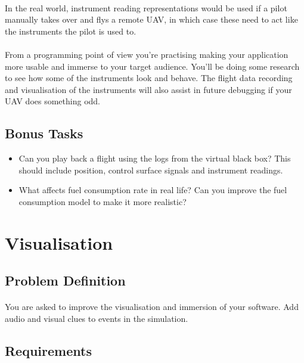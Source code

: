 \documentclass[11pt]{book}
\begin{document}
\paragraph{} In the real world, instrument reading representations would be used if a pilot manually takes over and flys a remote UAV, in which case these need to act like the instruments the pilot is used to. 

\paragraph{} From a programming point of view you're practising making your application more usable and immerse to your target audience. You'll be doing some research to see how some of the instruments look and behave. The flight data recording and visualisation of the instruments will also assist in future debugging if your UAV does something odd.

\subsection{Bonus Tasks}

\begin{itemize}
\item Can you play back a flight using the logs from the virtual black box? This should include position, control surface signals and instrument readings.
\item What affects fuel consumption rate in real life? Can you improve the fuel consumption model to make it more realistic?
\end{itemize}

\clearpage



\section{Visualisation}

\subsection{Problem Definition}

\paragraph{} You are asked to improve the visualisation and immersion of your software. Add audio and visual clues to events in the simulation.

\subsection{Requirements}
\end{document}
